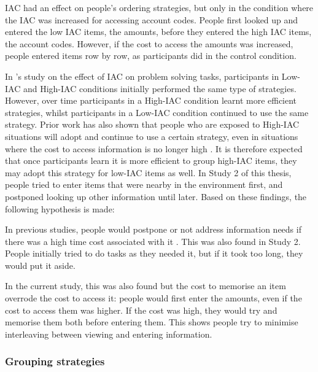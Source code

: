 \begin{table}
\begin{itemize}
IAC had an effect on people's ordering strategies, but only in the condition where the IAC was increased for accessing account codes. People first looked up and entered the low IAC items, the amounts, before they entered the high IAC items, the account codes. However, if the cost to access the amounts was increased, people entered items row by row, as participants did in the control condition.

In \citet{OHara1998}'s study on the effect of IAC on problem solving tasks, participants in Low-IAC and High-IAC conditions initially performed the same type of strategies. However, over time participants in a High-IAC condition  learnt more efficient strategies, whilst participants in a Low-IAC condition continued to use the same strategy. Prior work has also shown that people who are exposed to High-IAC situations will adopt and continue to use a certain strategy, even in situations where the cost to access information is no longer high \citep{Patrick2014}. It is therefore expected that once participants learn it is more efficient to group high-IAC items, they may adopt this strategy for low-IAC items as well. In Study 2 of this thesis, people tried to enter items that were nearby in the environment first, and postponed looking up other information until later. Based on these findings, the following hypothesis is made: 

In previous studies, people would postpone or not address information needs if there was a high time cost associated with it \citep{Sohn2008}. This was also found in Study 2. People initially tried to do tasks as they needed it, but if it took too long, they would put it aside.

In the current study, this was also found but the cost to memorise an item overrode the cost to access it: people would first enter the amounts, even if the cost to access them was higher.
If the cost was high, they would try and memorise them both before entering them. This shows people try to minimise interleaving between viewing and entering information. 

\subsubsection{Grouping strategies}


\end{itemize}
\end{table}
